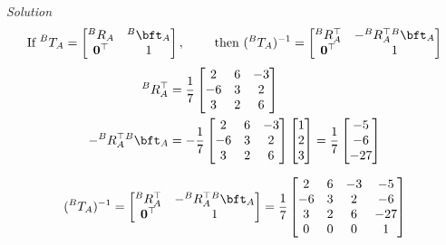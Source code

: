 \documentclass{article}
\numberwithin{prob}{section}
\newenvironment{solution}{\emph{Solution}}{}
\begin{document}
\begin{solution}
\begin{align}
  \text{If }
  ^BT_A = \begin{bmatrix}
    ^BR_A & ^B\bft_A \\ 
    \mathbf{0}^\top & 1
  \end{bmatrix},
  \qquad \text{ then }
  ({}^BT_A)^{-1} = \begin{bmatrix}
    {}^BR^\top_A & - {}^BR^\top_A {}^B\bft_A \\ 
    \mathbf{0}^\top & 1
  \end{bmatrix}
\end{align}
\begin{align}
  {}^BR^\top_A &= \frac{1}{7}\begin{bmatrix}
    2 & 6 & -3 \\
    -6 & 3 & 2 \\
    3 & 2 & 6
  \end{bmatrix}\\
    - {}^BR^\top_A {}^B\bft_A &=  - \frac{1}{7}\begin{bmatrix}
    2 & 6 & -3 \\
    -6 & 3 & 2 \\
    3 & 2 & 6
    \end{bmatrix} \begin{bmatrix} 1 \\ 2 \\ 3 \end{bmatrix}
    = \frac{1}{7}\begin{bmatrix} -5 \\ -6 \\ -27 \end{bmatrix}
\end{align}

\begin{align}
  ({}^BT_A)^{-1} = \begin{bmatrix}
    {}^BR^\top_A & - {}^BR^\top_A {}^B\bft_A \\ 
    \mathbf{0}^\top & 1
  \end{bmatrix}
  = \frac{1}{7}\begin{bmatrix}
    2 & 6 & -3 & -5\\
    -6 & 3 & 2 & -6\\
    3 & 2 & 6 & -27 \\
    0 & 0 & 0 & 1
  \end{bmatrix}
\end{align}

\end{solution}
\end{document}
